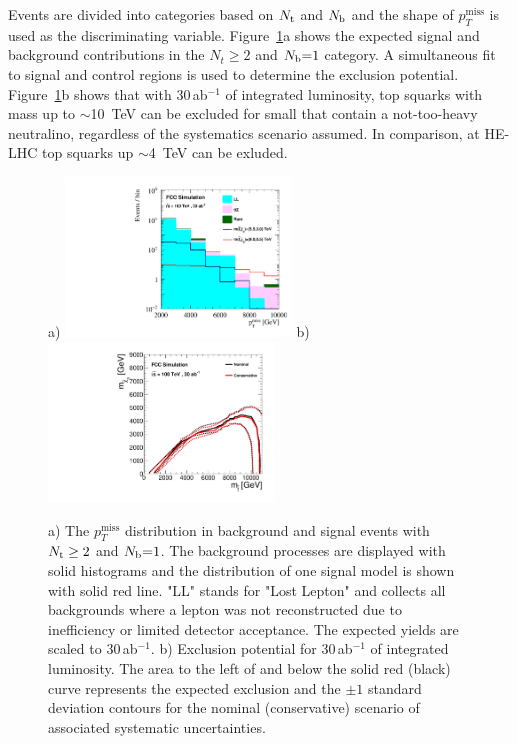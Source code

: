 \documentclass[11pt,twoside,a4paper]{cernrep}
\begin{document}
Events are divided into categories based on $N_{\rm t}$ and $N_{\rm b}$ and the shape of $p_T^{\mathrm{miss}}$ is used as the discriminating variable. Figure~\ref{stops}a shows the expected signal and background contributions in the $N_t \geq 2$ and $N_{\rm b}{=}1$ category. A simultaneous fit to signal and control regions is used to determine the exclusion potential. Figure~\ref{stops}b shows that with 30\,ab$^{-1}$ of integrated luminosity, top squarks with mass up to $\sim$10~TeV can be excluded for small that contain a not-too-heavy neutralino, regardless of the systematics scenario assumed. In comparison, at HE-LHC top squarks up $\sim$4~TeV can be exluded.
%
%
%
\begin{figure}
  \centering
  a)
  \includegraphics[width=6cm]{sr_1.pdf}
  b)
  \includegraphics[width=6cm]{lim_30ab_comb.pdf}
  \caption{a) The $p_T^{\mathrm{miss}}$ distribution in background and signal events with $N_{\rm t} \geq 2$ and $N_{\rm b}{=}1$. The background processes are displayed with solid histograms and the distribution of one signal model is shown with solid red line. "LL" stands for "Lost Lepton" and collects all backgrounds where a lepton was not reconstructed due to inefficiency or limited detector acceptance. The expected yields are scaled to 30\,ab$^{-1}$. b) Exclusion potential for 30\,ab$^{-1}$ of integrated luminosity. The area to the left of and below the solid red (black) curve represents the expected exclusion and the $\pm1$ standard deviation contours for the nominal (conservative) scenario of associated systematic uncertainties. }
  \label{stops}
\end{figure}
\end{document}
